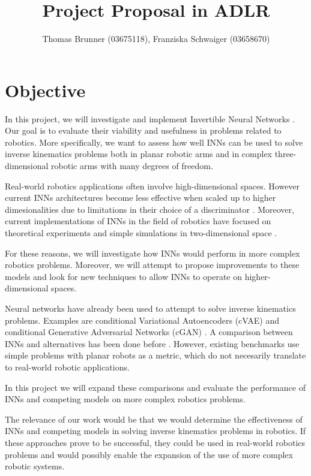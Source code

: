 \documentclass[12pt]{extarticle}
\title{Project Proposal in ADLR}
\author{Thomas Brunner (03675118), Franziska Schwaiger (03658670)}
\begin{document}
\maketitle

\section*{Objective}

In this project, we will investigate and implement Invertible Neural Networks \cite{Ardizzone2018}.
Our goal is to evaluate their viability and usefulness in problems related to robotics.
More specifically, we want to assess how well INNs can be used to solve inverse kinematics problems
both in planar robotic arms and in complex three-dimensional robotic arms with many degrees of freedom.

Real-world robotics applications often involve high-dimensional spaces.
However current INNs architectures become less effective when scaled up to higher dimesionalities
due to limitations in their choice of a discriminator \cite{Ardizzone2018}.
Moreover, current implementations of INNs in the field of robotics have focused on theoretical experiments
and simple simulations in two-dimensional space \cite{Ardizzone2018}.

For these reasons, we will investigate how INNs would perform in more complex robotics problems.
Moreover, we will attempt to propose improvements to these models and look for new techniques to allow
INNs to operate on higher-dimensional spaces.

Neural networks have already been used to attempt to solve inverse kinematics problems.
Examples are conditional Variational Autoencoders (cVAE) \cite{Sohn2015}
and conditional Generative Adversarial Networks (cGAN) \cite{Mehdi2018}.
A comparison between INNs and alternatives has been done before \cite{Kruse2019}.
However, existing benchmarks use simple problems with planar robots as a metric,
which do not necesarily translate to real-world robotic applications.

In this project we will expand these comparisons and evaluate the performance of INNs and competing models on
more complex robotics problems.

The relevance of our work would be that we would determine the effectiveness of INNs
and competing models in solving inverse kinematics problems in robotics.
If these approaches prove to be successful, they could be used in real-world robotics problems
and would possibly enable the expansion of the use of more complex robotic systems.
\end{document}
